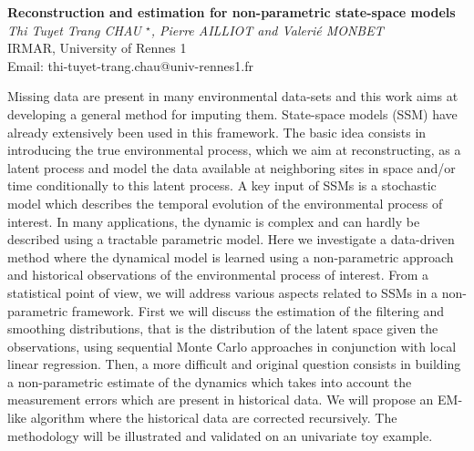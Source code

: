 \documentclass[12pt]{article}
\newcommand{\postertitle}[1]{{\Large\bf #1}\\[12pt]}
\newcommand{\authors}[1]{\emph{#1}\\}
\newcommand{\affiliations}[1]{{#1}\\}
\newcommand{\contacts}[1]{{#1}}
\begin{document}
\begin{center}
\vspace*{0.5cm}
%
\postertitle{Reconstruction and estimation for non-parametric state-space models}
%
\authors{Thi Tuyet Trang CHAU $^\star$, Pierre AILLIOT and Valeri\'e MONBET} %
% 
\affiliations{IRMAR, University of Rennes 1}
%
\contacts{Email: thi-tuyet-trang.chau@univ-rennes1.fr} %
%
\vspace*{0.3cm}
\end{center}

Missing data are present in many environmental data-sets and this work aims at developing a general method for imputing them. State-space models (SSM) have already extensively been used in this framework. The basic idea consists in introducing the true environmental process, which we aim at reconstructing, as a latent process and model the data available at neighboring sites in space and/or time conditionally to this latent process.
    A key input of SSMs is a stochastic model which describes the temporal evolution of the environmental process of interest. In many applications, the dynamic is complex and can hardly be described using a tractable parametric model. Here we investigate a data-driven method where the dynamical model is learned using a non-parametric approach and historical observations of the environmental process of interest.
    From a statistical point of view, we will address various aspects related to SSMs in a non-parametric framework. First we will discuss the estimation of the filtering and smoothing distributions, that is the distribution of the latent space given the observations, using sequential Monte Carlo approaches in conjunction with local linear regression. Then, a more difficult and original question consists in building a non-parametric estimate of the dynamics which takes into account the measurement errors which are present in historical data. We will propose an EM-like algorithm where the historical data are corrected recursively.
    The methodology will be illustrated and validated on an univariate toy example.

%
\end{document}
